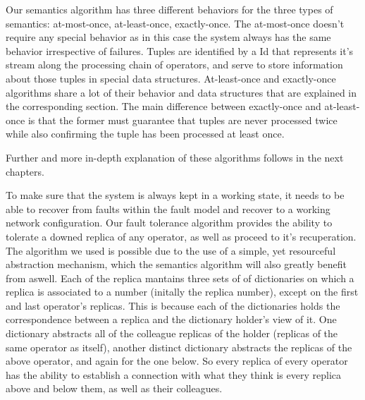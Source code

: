 \documentclass[times, 10pt,twocolumn]{article}
\begin{document}
	Our semantics algorithm has three different behaviors for the three types 
of semantics: at-most-once, at-least-once, exactly-once. The at-most-once
doesn't require any special behavior as in this case the system always has the same 
behavior irrespective of failures. Tuples are identified by a Id that represents it's stream along the processing chain of operators, and serve to store information about those tuples in special data structures. At-least-once and exactly-once algorithms share 
a lot of their behavior and data structures that are explained in the corresponding section. 
The main difference between exactly-once and at-least-once is that the former 
must guarantee that tuples are never processed twice while also confirming the tuple has been processed at least once.

	Further and more in-depth explanation of these algorithms follows in the next chapters.


To make sure that the system is always kept in a working state, it needs
to be able to recover from faults within the fault model and recover to a
working network configuration. Our fault tolerance algorithm provides the
ability to tolerate a downed replica of any operator, as well as proceed
to it's recuperation. The algorithm we used is possible due to the use of
a simple, yet resourceful abstraction mechanism, which the semantics
algorithm will also greatly benefit from aswell. Each of the replica
mantains three sets of of dictionaries on which a replica is associated to
a number (initally the replica number), except on the first and last
operator's replicas. This is because each of the dictionaries holds the
correspondence between a replica and the dictionary holder's view of it.
One dictionary abstracts all of the colleague replicas of the holder
(replicas of the same operator as itself), another distinct dictionary
abstracts the replicas of the above operator, and again for the one below.
So every replica of every operator has the ability to establish a
connection with what they think is every replica above and below them, as
well as their colleagues.


\end{document}

